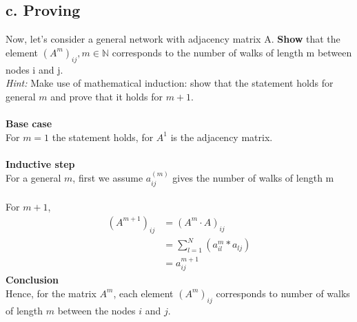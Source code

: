 \documentclass[a4paper,12pt]{article}
\begin{document}
\subsection*{c. Proving}
Now, let's consider a general network with adjacency matrix A. \textbf{Show} that the element $(A^m)_{ij}, m \in \mathbb{N}$  corresponds to the number of walks of length m between nodes i and j. \\ \textit{Hint:} Make use of mathematical induction: show that the  statement holds for general $m$ and prove that it holds for $m+1$.\\\\\textbf{Base case}\\
For $m=1$ the statement holds, for $A^1$ is the adjacency matrix.\\\\
\textbf{Inductive step}\\
For a general $m$, first we assume $a_{ij}^{(m)}$ gives the number of walks of length m\\\\
For $m+1$, 
\begin{equation}
\begin{split}
(A^{m+1})_{ij} & = (A^m \cdot A)_{ij} \\
& = \sum_{l=1}^{N} (a_{il}^m * a_{lj})\\
& = a_{ij}^{m+1}
\end{split}
\end{equation}
\textbf{Conclusion}\\
Hence, for the matrix $A^m$, each element $(A^m)_{ij}$ corresponds to number of walks of length $m$ between the nodes $i$ and $j$. 
\end{document}
